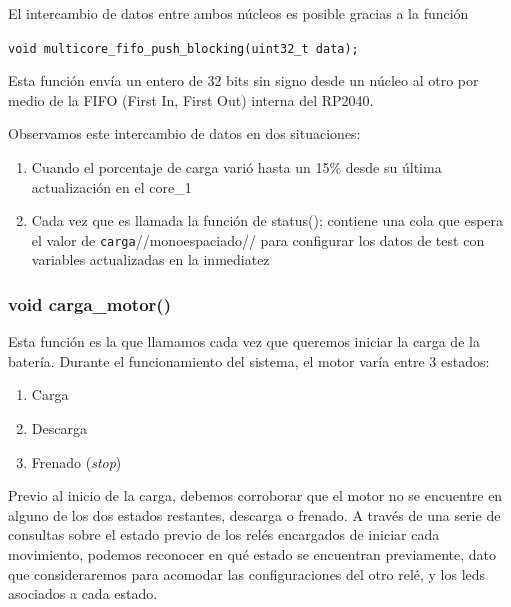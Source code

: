                     El intercambio de datos entre ambos núcleos es posible gracias a la función\par
                    \texttt{void multicore\_fifo\_push\_blocking(uint32\_t data);}\par
                    Esta función envía un entero de 32 bits sin signo desde un núcleo al otro por medio de la FIFO (First In, First Out) interna del RP2040.\par
                    Observamos este intercambio de datos en dos situaciones:\par

                    \begin{enumerate}
                    \setlength{\itemindent}{1.5em}
                    
                        \item Cuando el porcentaje de carga varió hasta un 15\% desde su última actualización en el core\_1\par
                        \par
                        \item Cada vez que es llamada la función de status(); contiene una cola que espera el valor de \texttt{carga}//monoespaciado// para configurar los datos de test con variables actualizadas en la inmediatez\par
                    \end{enumerate}

                \subsubsection{void carga\_motor()}
                    Esta función es la que llamamos cada vez que queremos iniciar la carga de la batería. Durante el funcionamiento del sistema, el motor varía entre 3 estados:\par
                    \begin{enumerate}
                        \setlength{\itemindent}{1.5em}
                        \item Carga
                        \item Descarga
                        \item Frenado (\textit{stop})
                    \end{enumerate}

                    Previo al inicio de la carga, debemos corroborar que el motor no se encuentre en alguno de los dos estados restantes, descarga o frenado. A través de una serie de consultas sobre el estado previo de los relés encargados de iniciar cada movimiento, podemos reconocer en qué estado se encuentran previamente, dato que consideraremos para acomodar las configuraciones del otro relé, y los leds asociados a cada estado.\par


